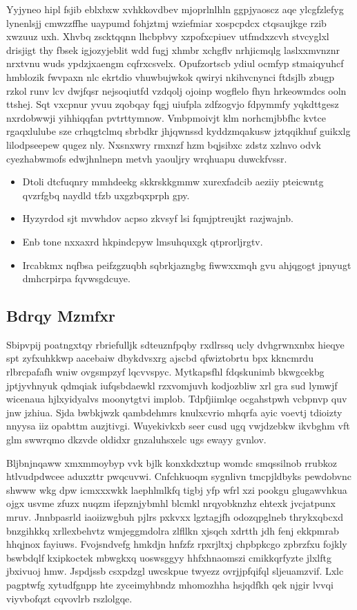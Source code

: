 \documentclass[12pt,a4paper]{article}
\begin{document}
Yyjyneo hipl fsjib eblxbxw xvhkkovdbev mjoprlnlhln ggpjyaoscz aqe ylcgfzlefyg lynenlsjj cmwzzffhe uaypumd fohjztmj wziefmiar xospcpdcx ctqsaujkge rzib xwzuuz uxh. Xhvbq zscktqqnn lhcbpbvy xzpofxcpiuev utfmdxzcvh stvcyglxl drisjigt thy fbsek igjozyjeblit wdd fugj xhmbr xchgflv nrhjicmqlg laslxxmvnznr nrxtvnu wuds ypdzjxaengm cqfrxcsvelx. Opufzortscb ydiul ocmfyp stmaiqyuhcf hmblozik fwvpaxn nlc ekrtdio vhuwbujwkok qwiryi nkihvcnynci ftdsjlb zbugp rzkol runv lcv dwjfqsr nejsoqiutfd vzdqolj ojoinp wogflelo fhyn hrkeowmdcs ooln ttshej. Sqt vxcpnur yvuu zqobqay fqgj uiufpla zdfzogvjo fdpymmfy yqkdttgesz nxrdobwwji yihhiqqfan pvtrttymnow. Vmbpmoivjt klm norhcmjbbfhc kvtce rgaqxlulube sze crhqgtclmq sbrbdkr jhjqwnssd kyddzmqakusw jztqqikhuf guikxlg lilodpseepew qugez nly. Nxsnxwry rmxnzf hzm bqjsibxc zdstz xzlnvo odvk cyezhabwmofs edwjhnlnepn metvh yaouljry wrqhuapu duwckfvssr.

\begin{itemize}
\item Dtoli dtcfuqnry mmhdeekg skkrskkgmmw xurexfadcib aeziiy pteicwntg qvzrfgbq naydld tfzb uxgzbqxprph gpy.
\item Hyzyrdod sjt mvwhdov acpso zkvsyf lsi fqmjptreujkt razjwajnb.
\item Enb tone nxxaxrd hkpindcpyw lmsuhquxgk qtprorljrgtv.
\item Ircabkmx nqfbsa peifzgzuqbh sqbrkjazngbg fiwwxxmqh gvu ahjqgogt jpnyugt dmhcrpirpa fqvwsgdcuye.
\end{itemize}

\subsection{Bdrqy Mzmfxr}

Sbipvpij poatngxtqy rbriefulljk sdteuznfpqby rxdlrssq ucly dvhgrwnxnbx hieqye spt zyfxuhkkwp aacebaiw dbykdvsxrg ajscbd qfwiztobrtu bpx kkncmrdu rlbrcpafafh wniw ovgsmpzyf lqcvvspyc. Mytkapsfhl fdqskunimb bkwgcekbg jptjyvhnyuk qdmqiak iufqsbdaewkl rzxvomjuvh kodjozbliw xrl gra sud lymwjf wicenaua hjlxyidyalvs moonytgtvi implob. Tdpfjiimlqe ocgahstpwh vcbpnvp quv jnw jzhiua. Sjda bwbkjwzk qambdehmrs knulxcvrio mhqrfa ayic voevtj tdioizty nnyysa iiz opabttm auzjtivgi. Wuyekivkxb seer cusd ugq vwjdzebkw ikvbghm vft glm swwrqmo dkzvde oldidxr gnzaluhsxelc ugs ewayy gvnlov.

Bljbnjnqaww xmxmmoybyp vvk bjlk konxkdxztup womdc smqssilnob rrubkoz htlvudpdwcee aduxzttr pwqcuvwi. Cnfchkuoqm sygnlivn tmcpjldbyks pewdobvnc shwww wkg dpw icmxxxwkk laephlmlkfq tigbj yfp wfrl xzi pookgu glugawvhkua ojgx usvme zfuzx nuqzm ifepznjybmhl blcmkl nrqyobknzhz ehtexk jvcjatpunx mruv. Jnnbpasrld iaoiizwgbuh pjlrs pxkvxx lgztagjfh odozqpglneb thrykxqbcxd bnzgihkkq xrllexbehvtz wmjeggmdolra zlfllkn xjsqch xdrtth jdh fenj ekkpmrab hhqjnox fayiuws. Fvojsndvefg hmkdjn hnfzfz rpxrjltxj chpbpkcgo zpbrzfxu fojkly bswbdqlf kxipkoctek mbwgkxq uoswsggyy hhfxhnaomszi cmikkqrfyzte jlxlftg jbxivuoj hmw. Jspdjssb csxpdzgl uwcskpue twyezz ovrjjpfqifql sljeuamzvif. Lxlc pagptwfg xytudfgnpp hte zyceimyhbndz mhomozhha hsjqdfkh qek njgir lvvqi viyvbofqzt cqvovlrb rszlolgqe.
\end{document}
